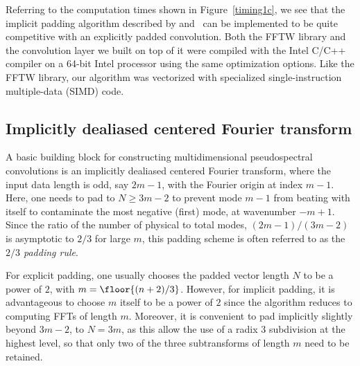 \documentclass[final]{siamltex}
\begin{document}
Referring to the computation times shown in Figure~\ref{timing1c},
we see that the implicit padding algorithm described by  
and~
can be implemented to be quite competitive with an explicitly padded
convolution. Both the FFTW library and the convolution layer we built on top of it were compiled with the
Intel C/C++ compiler on a 64-bit Intel processor using the same optimization
options. Like the FFTW library, our algorithm was vectorized with
specialized single-instruction multiple-data (SIMD) code.

\subsection{Implicitly dealiased centered Fourier transform}\label{fft0}
A basic building block for constructing multidimensional pseudospectral
convolutions is an implicitly dealiased centered Fourier transform, where the
input data length is odd, say $2m-1$, with the Fourier origin at index $m-1$. 
Here, one needs to pad to $N\ge 3m-2$ to prevent 
mode $m-1$ from beating with itself to contaminate the most negative
(first) mode, at wavenumber $-m+1$. Since the ratio of the number of physical to
total modes, $(2m-1)/(3m-2)$ is asymptotic to $2/3$ for large $m$, this
padding scheme is often referred to as the {\it $2/3$ padding rule}.

For explicit padding, one usually chooses the padded vector length
$N$ to be a power of $2$, with $m=\floor{(n+2)/3}$. However, for implicit
padding, it is advantageous to choose $m$ itself to be a power of $2$
since the algorithm reduces to computing FFTs of length $m$.
Moreover, it is convenient to pad implicitly slightly beyond $3m-2$, to $N=3m$,
as this allow the use of a radix $3$ subdivision at the highest level, so
that only two of the three subtransforms of length $m$ need to be retained. 
\end{document}
